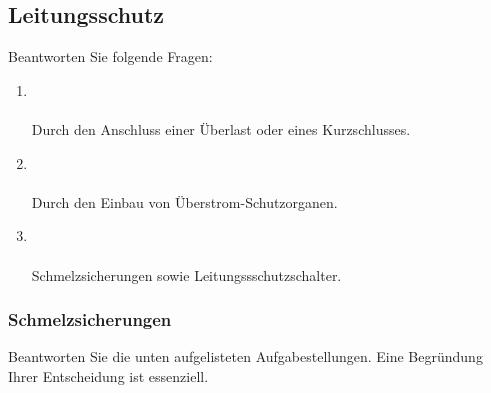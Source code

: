 \subsection{Leitungsschutz}
Beantworten Sie folgende Fragen:

\begin{enumerate}
    \item   {} \\\\
            Durch den Anschluss einer Überlast oder eines Kurzschlusses.
    \item   {}\\\\
            Durch den Einbau von Überstrom-Schutzorganen.
    \item   {}\\\\
            Schmelzsicherungen sowie Leitungssschutzschalter.
\end{enumerate}

\subsubsection{Schmelzsicherungen}
Beantworten Sie die unten aufgelisteten Aufgabestellungen. Eine Begründung Ihrer Entscheidung ist essenziell.

